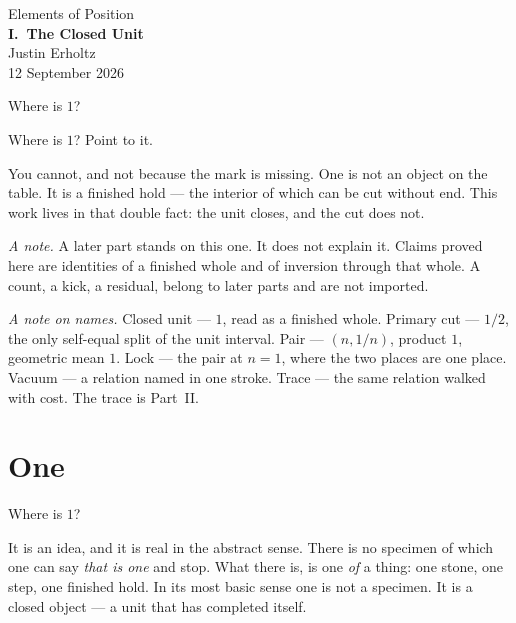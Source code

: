 \documentclass[10pt,a4paper]{article}
\theoremstyle{plain}
\theoremstyle{definition}
\theoremstyle{remark}
\begin{document}
\begin{center}
\vspace*{2.0em}
{\large Elements of Position}\\[1.5em]
{\LARGE\bfseries I.\ The Closed Unit}\\[2.0em]
{\normalsize Justin Erholtz}\\[0.3em]
{\small 12 September 2026}
\end{center}

\vspace{1.8em}

\begin{center}
{\large Where is \(1\)?}
\end{center}

\vspace{1.4em}

\noindent
Where is \(1\)? Point to it.

You cannot, and not because the mark is missing.
One is not an object on the table.
It is a finished hold --- the interior of which can be cut without end.
This work lives in that double fact: the unit closes, and the cut does not.

\vspace{1.0em}
\noindent
\textit{A note.}
A later part stands on this one.
It does not explain it.
Claims proved here are identities of a finished whole and of inversion through that whole.
A count, a kick, a residual, belong to later parts and are not imported.

\vspace{0.6em}
\noindent
\textit{A note on names.}
Closed unit --- \(1\), read as a finished whole.
Primary cut --- \(1/2\), the only self-equal split of the unit interval.
Pair --- \((n,1/n)\), product \(1\), geometric mean \(1\).
Lock --- the pair at \(n=1\), where the two places are one place.
Vacuum --- a relation named in one stroke.
Trace --- the same relation walked with cost.
The trace is Part~II.

\newpage
\tableofcontents
\newpage

\section{One}

Where is \(1\)?

It is an idea, and it is real in the abstract sense.
There is no specimen of which one can say \emph{that is one} and stop.
What there is, is one \emph{of} a thing: one stone, one step, one finished hold.
In its most basic sense one is not a specimen.
It is a closed object --- a unit that has completed itself.
\end{document}
